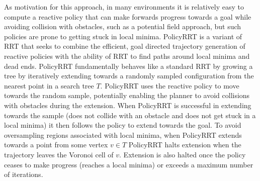 \documentclass[../thesis.tex]{subfiles}
\begin{document}
As motivation for this approach, in many environments it is relatively easy to compute a reactive policy that can make forwards progress towards a goal while avoiding collision with obstacles, such as a potential field approach, but such policies are prone to getting stuck in local minima.
PolicyRRT is a variant of RRT that seeks to combine the efficient, goal directed trajectory generation of reactive policies with the ability of RRT to find paths around local minima and dead ends.
PolicyRRT fundamentally behaves like a standard RRT by growing a tree by iteratively extending towards a randomly sampled configuration from the nearest point in a search tree $T$.
PolicyRRT uses the reactive policy to move towards the random sample, potentially enabling the planner to avoid collisions with obstacles during the extension.
When PolicyRRT is successful in extending towards the sample (does not collide with an obstacle and does not get stuck in a local minima) it then follows the policy to extend towards the goal.
To avoid oversampling regions associated with local minima, when PolicyRRT extends towards a point from some vertex $v \in T$ PolicyRRT halts extension when the trajectory leaves the Voronoi cell of $v$.
Extension is also halted once the policy ceases to make progress (reaches a local minima) or exceeds a maximum number of iterations.

\end{document}
